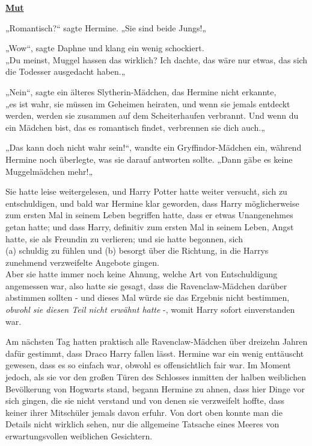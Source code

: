 

\hypertarget{mut}{%

\textbf{\uline{Mut}}

\hfill\break „Romantisch?“ sagte Hermine. „Sie sind beide Jungs!„

„Wow“, sagte Daphne und klang ein wenig schockiert.\\ „Du meinst, Muggel hassen das wirklich? Ich dachte, das wäre nur etwas, das sich die Todesser ausgedacht haben.„

„Nein“, sagte ein älteres Slytherin-Mädchen, das Hermine nicht erkannte,\\ „es ist wahr, sie müssen im Geheimen heiraten, und wenn sie jemals entdeckt werden, werden sie zusammen auf dem Scheiterhaufen verbrannt. Und wenn du ein Mädchen bist, das es romantisch findet, verbrennen sie dich auch.„

„Das kann doch nicht wahr sein!“, wandte ein Gryffindor-Mädchen ein, während Hermine noch überlegte, was sie darauf antworten sollte. „Dann gäbe es keine Muggelmädchen mehr!„

Sie hatte leise weitergelesen, und Harry Potter hatte weiter versucht, sich zu entschuldigen, und bald war Hermine klar geworden, dass Harry möglicherweise zum ersten Mal in seinem Leben begriffen hatte, dass er etwas Unangenehmes getan hatte; und dass Harry, definitiv zum ersten Mal in seinem Leben, Angst hatte, sie als Freundin zu verlieren; und sie hatte begonnen, sich\\ (a) schuldig zu fühlen und (b) besorgt über die Richtung, in die Harrys zunehmend verzweifelte Angebote gingen.\\ Aber sie hatte immer noch keine Ahnung, welche Art von Entschuldigung angemessen war, also hatte sie gesagt, dass die Ravenclaw-Mädchen darüber abstimmen sollten - und dieses Mal würde sie das Ergebnis nicht bestimmen, \emph{obwohl sie diesen Teil nicht erwähnt hatte} -, womit Harry sofort einverstanden war.

Am nächsten Tag hatten praktisch alle Ravenclaw-Mädchen über dreizehn Jahren dafür gestimmt, dass Draco Harry fallen lässt. Hermine war ein wenig enttäuscht gewesen, dass es so einfach war, obwohl es offensichtlich fair war. Im Moment jedoch, als sie vor den großen Türen des Schlosses inmitten der halben weiblichen Bevölkerung von Hogwarts stand, begann Hermine zu ahnen, dass hier Dinge vor sich gingen, die sie nicht verstand und von denen sie verzweifelt hoffte, dass keiner ihrer Mitschüler jemals davon erfuhr. Von dort oben konnte man die Details nicht wirklich sehen, nur die allgemeine Tatsache eines Meeres von erwartungsvollen weiblichen Gesichtern.

}
